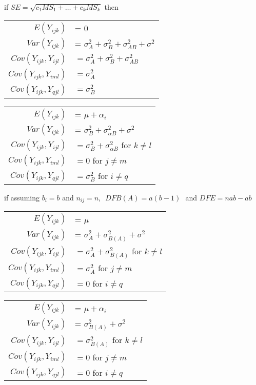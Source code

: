 \documentclass[]{article}
\begin{document}
if $SE = \sqrt{ c_1 MS_1 + \dots +  c_k MS_k }$ then



\begin{table}[H]
	\begin{tabular}{r l }
		$E(Y_{ijk}) $& = $0$\\
		$Var(Y_{ijk}) $& = $\sigma^2_A + \sigma^2_B + \sigma^2_{AB} + \sigma^2 $\\
		$Cov(Y_{ijk}, Y_{ijl})$ &$ = \sigma_A^2 + \sigma_B^2 + \sigma_{AB}^2 $\\
		$Cov(Y_{ijk}, Y_{iml}) $& $= \sigma_A^2 $ \\
		$Cov(Y_{ijk}, Y_{qjl})$ & $ = \sigma_B^2$
	\end{tabular}
\end{table}




\begin{table}[H]
	\begin{tabular}{r l }
		$E(Y_{ijk}) $& = $\mu +  \alpha_i$\\
		$Var(Y_{ijk}) $& = $\sigma^2_B + \sigma^2_{\alpha B} + \sigma^2 $\\
		$Cov(Y_{ijk}, Y_{ijl})$ & $= \sigma_B^2 + \sigma_{\alpha B}^2 $ for $k \neq l$\\
		$Cov(Y_{ijk}, Y_{iml}) $& $= 0$ for $j \neq m$ \\
		$Cov(Y_{ijk}, Y_{qjl})$ & $ = \sigma_B^2$ for $ i \neq q$
	\end{tabular}
\end{table}


if assuming $b_i = b$ and $n_{ij} =n$, $ DF B(A) = a(b-1) $ and $DF E = nab - ab$



\begin{table}[H]
	\begin{tabular}{r l }
		$E(Y_{ijk}) $& = $\mu $\\
		$Var(Y_{ijk}) $& = $\sigma^2_A + \sigma^2_{B(A)} + \sigma^2 $\\
		$Cov(Y_{ijk}, Y_{ijl})$ & $= \sigma_A^2 + \sigma^2_{B(A)}$ for $k \neq l$\\
		$Cov(Y_{ijk}, Y_{iml}) $& $= \sigma_A^2$ for $j \neq m$ \\
		$Cov(Y_{ijk}, Y_{qjl})$ & $ = 0$ for $ i \neq q$
	\end{tabular}
\end{table}



\begin{table}[H]
	\begin{tabular}{r l }
		$E(Y_{ijk}) $& = $\mu + \alpha_i $\\
		$Var(Y_{ijk}) $& = $ \sigma^2_{B(A)} + \sigma^2 $\\
		$Cov(Y_{ijk}, Y_{ijl})$ & $=  \sigma^2_{B(A)}$ for $k \neq l$\\
		$Cov(Y_{ijk}, Y_{iml}) $& $= 0$ for $j \neq m$ \\
		$Cov(Y_{ijk}, Y_{qjl})$ & $ = 0$ for $ i \neq q$
	\end{tabular}
\end{table}
\end{document}
